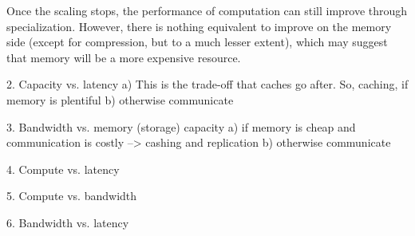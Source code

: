 Once the scaling stops, the performance of computation can still improve through specialization. However, there is nothing equivalent to improve on the memory side (except for compression, but to a much lesser extent), which may suggest that memory will be a more expensive resource. 

2. Capacity vs. latency
   a) This is the trade-off that caches go after. So, caching, if memory is plentiful
   b) otherwise communicate


3. Bandwidth vs. memory (storage) capacity
  a) if memory is cheap and communication is costly --> cashing and replication
  b) otherwise communicate
 
4. Compute vs. latency

5. Compute vs. bandwidth
 
6. Bandwidth vs. latency

